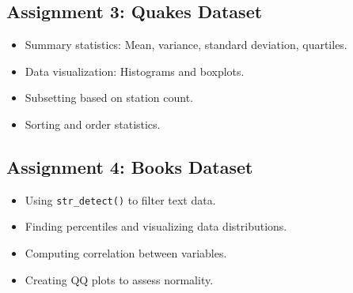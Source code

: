 \documentclass{article}
\begin{document}
\subsection{Assignment 3: Quakes Dataset}
\begin{itemize}
    \item Summary statistics: Mean, variance, standard deviation, quartiles.
    \item Data visualization: Histograms and boxplots.
    \item Subsetting based on station count.
    \item Sorting and order statistics.
\end{itemize}



\subsection{Assignment 4: Books Dataset}
\begin{itemize}
    \item Using \texttt{str\_detect()} to filter text data.
    \item Finding percentiles and visualizing data distributions.
    \item Computing correlation between variables.
    \item Creating QQ plots to assess normality.
\end{itemize}
\end{document}
